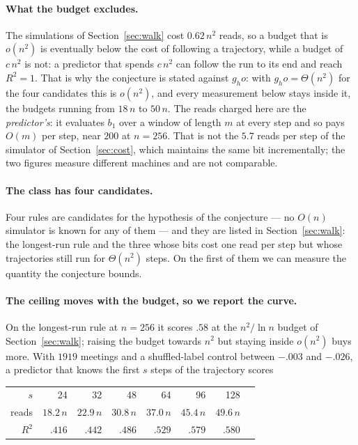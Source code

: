 \documentclass[11pt]{article}
\begin{document}
\paragraph{What the budget excludes.} The simulations of Section~\ref{sec:walk} cost $0.62\,n^2$ reads,
so a budget that is $o(n^2)$ is eventually below the cost of following a trajectory, while a budget of
$c\,n^2$ is not: a predictor that spends $c\,n^2$ can follow the run to its end and reach $R^2=1$. That
is why the conjecture is stated against $g_
ho$: with $g_
ho=\Theta(n^2)$ for the four candidates
this is $o(n^2)$, and every measurement below stays inside it, the budgets running from $18\,n$ to
$50\,n$. The reads charged here are the \emph{predictor's}:
it evaluates $b_1$ over a window of length $m$ at every step and so pays $O(m)$ per step, near $200$ at
$n=256$. That is not the $5.7$ reads per step of the simulator of Section~\ref{sec:cost}, which
maintains the same bit incrementally; the two figures measure different machines and are not
comparable.

\paragraph{The class has four candidates.} Four rules are candidates for the hypothesis of the
conjecture --- no $O(n)$ simulator is known for any of them --- and they are listed
in Section~\ref{sec:walk}: the longest-run rule and the three whose bits cost one read per step but
whose trajectories still run for $\Theta(n^2)$ steps. On the first of them we can measure the quantity
the conjecture bounds.

\paragraph{The ceiling moves with the budget, so we report the curve.} On the longest-run rule at
$n=256$ it scores $.58$ at the $n^2/\ln n$ budget of Section~\ref{sec:walk}; raising the budget towards
$n^2$ but staying inside $o(n^2)$ buys more. With $1919$ meetings and a shuffled-label control between
$-.003$ and $-.026$, a predictor that knows the first $s$ steps of the trajectory scores

\begin{center}
\small
\begin{tabular}{rrrrrrrr}
\toprule
$s$ & 24 & 32 & 48 & 64 & 96 & 128 \\
reads & $18.2\,n$ & $22.9\,n$ & $30.8\,n$ & $37.0\,n$ & $45.4\,n$ & $49.6\,n$ \\
$R^2$ & $.416$ & $.442$ & $.486$ & $.529$ & $.579$ & $.580$ \\
\bottomrule
\end{tabular}
\end{center}
\end{document}
